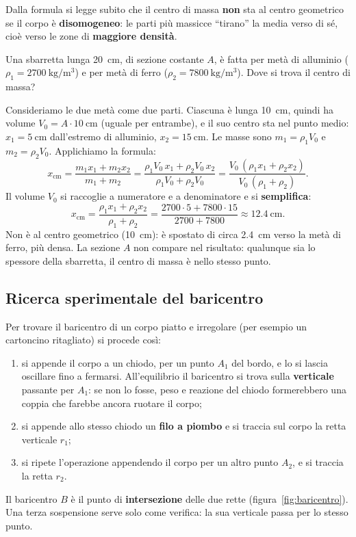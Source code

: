 Dalla formula si legge subito che il centro di massa \textbf{non} sta al centro geometrico se il corpo è \textbf{disomogeneo}: le parti più massicce ``tirano'' la media verso di sé, cioè verso le zone di \textbf{maggiore densità}.

\begin{testexample}
Una sbarretta lunga \SI{20}{\centi\metre}, di sezione costante $A$, è fatta per metà di alluminio ($\rho_1 = \SI{2700}{\kilo\gram\per\metre\cubed}$) e per metà di ferro ($\rho_2 = \SI{7800}{\kilo\gram\per\metre\cubed}$). Dove si trova il centro di massa?

Consideriamo le due metà come due parti. Ciascuna è lunga \SI{10}{\centi\metre}, quindi ha volume $V_0 = A \cdot \SI{10}{\centi\metre}$ (uguale per entrambe), e il suo centro sta nel punto medio: $x_1 = \SI{5}{\centi\metre}$ dall'estremo di alluminio, $x_2 = \SI{15}{\centi\metre}$. Le masse sono $m_1 = \rho_1 V_0$ e $m_2 = \rho_2 V_0$. Applichiamo la formula:
\[ x_\text{cm} = \frac{m_1 x_1 + m_2 x_2}{m_1 + m_2}
   = \frac{\rho_1 V_0\, x_1 + \rho_2 V_0\, x_2}{\rho_1 V_0 + \rho_2 V_0}
   = \frac{V_0\,(\rho_1 x_1 + \rho_2 x_2)}{V_0\,(\rho_1 + \rho_2)}. \]
Il volume $V_0$ si raccoglie a numeratore e a denominatore e si \textbf{semplifica}:
\[ x_\text{cm} = \frac{\rho_1 x_1 + \rho_2 x_2}{\rho_1 + \rho_2}
   = \frac{2700 \cdot 5 + 7800 \cdot 15}{2700 + 7800} \approx \SI{12,4}{\centi\metre}. \]
Non è al centro geometrico (\SI{10}{\centi\metre}): è spostato di circa \SI{2,4}{\centi\metre} verso la metà di ferro, più densa. La sezione $A$ non compare nel risultato: qualunque sia lo spessore della sbarretta, il centro di massa è nello stesso punto.
\end{testexample}

\subsection{Ricerca sperimentale del baricentro}
Per trovare il baricentro di un corpo piatto e irregolare (per esempio un cartoncino ritagliato) si procede così:
\begin{enumerate}
\item si appende il corpo a un chiodo, per un punto $A_1$ del bordo, e lo si lascia oscillare fino a fermarsi. All'equilibrio il baricentro si trova sulla \textbf{verticale} passante per $A_1$: se non lo fosse, peso e reazione del chiodo formerebbero una coppia che farebbe ancora ruotare il corpo;
\item si appende allo stesso chiodo un \textbf{filo a piombo} e si traccia sul corpo la retta verticale $r_1$;
\item si ripete l'operazione appendendo il corpo per un altro punto $A_2$, e si traccia la retta $r_2$.
\end{enumerate}
Il baricentro $B$ è il punto di \textbf{intersezione} delle due rette (figura~\ref{fig:baricentro}). Una terza sospensione serve solo come verifica: la sua verticale passa per lo stesso punto.

